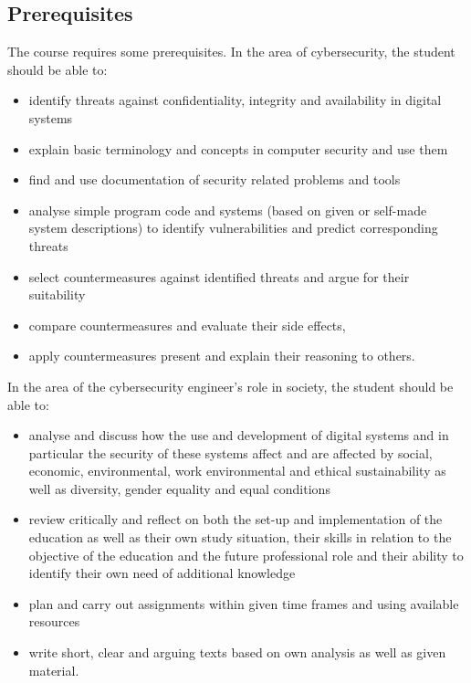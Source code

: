 \subsection{Prerequisites}

The course requires some prerequisites.
In the area of cybersecurity, the student should be able to:
\begin{itemize}
  \item identify threats against confidentiality, integrity and availability in 
    digital systems
  \item explain basic terminology and concepts in computer security and use 
    them
  \item find and use documentation of security related problems and tools
  \item analyse simple program code and systems (based on given or self-made 
    system descriptions) to identify vulnerabilities and predict corresponding 
    threats
  \item select countermeasures against identified threats and argue for their 
    suitability
  \item compare countermeasures and evaluate their side effects,
  \item apply countermeasures present and explain their reasoning to others.
\end{itemize}

In the area of the cybersecurity engineer's role in society, the student should 
be able to:
\begin{itemize}
  \item analyse and discuss how the use and development of digital systems and 
    in particular the security of these systems affect and are affected by 
    social, economic, environmental, work environmental and ethical 
    sustainability as well as diversity, gender equality and equal conditions
  \item review critically and reflect on both the set-up and implementation of 
    the education as well as their own study situation, their skills in 
    relation to the objective of the education and the future professional role 
    and their ability to identify their own need of additional knowledge
  \item plan and carry out assignments within given time frames and using 
    available resources
  \item write short, clear and arguing texts based on own analysis as well as 
    given material.
\end{itemize}

